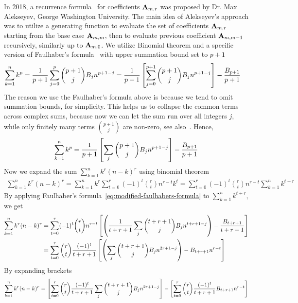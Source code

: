 In 2018, a recurrence formula~\cite{alekseyev2018mathoverflow} for coefficients ${\mathbf{A}} \sb{m,r}$
was proposed by Dr. Max Alekseyev, George Washington University.
The main idea of Alekseyev's approach was to utilize a generating function to evaluate
the set of coefficients ${\mathbf{A}} \sb{m,r}$
starting from the base case ${\mathbf{A}} \sb{m,m}$, then to evaluate previous coefficient ${\mathbf{A}} \sb{m,m-1}$
recursively, similarly up to ${\mathbf{A}} \sb{m,0}$.
We utilize Binomial theorem and a specific version
of Faulhaber's formula~\cite{beardon1996sums} with upper summation bound set to $p+1$
\begin{align*}
    \sum_{k=1}^{n} k^{p}
    = \frac{1}{p+1}\sum_{j=0}^{p} \binom{p+1}{j} {B}\sb{j} n^{p+1-j}
    &= \frac{1}{p+1} \left[ \sum_{j=0}^{p+1} \binom{p+1}{j} {B}\sb{j} n^{p+1-j} \right] - \frac{{B}\sb{p+1}}{p+1}
\end{align*}
The reason we use the Faulhaber's formula above is because we tend to omit summation bounds, for simplicity.
This helps us to collapse the common terms across complex sums, because now we can let the sum run over all integers $j$,
while only finitely many terms $\binom{p+1}{j}$ are non-zero, see also~\cite{knuth1992two}.
Hence,
\begin{align}
    \label{eq:modified-faulhabers-formula}
    \sum_{k=1}^{n} k^{p}
    = \frac{1}{p+1} \left[ \sum_{j} \binom{p+1}{j} {B}\sb{j} n^{p+1-j} \right] - \frac{{B}\sb{p+1}}{p+1}
\end{align}
Now we expand the sum $\sum_{k=1}^{n} k^{r} (n-k)^{r}$ using binomial theorem
\begin{align*}
    \sum_{k=1}^{n} k^{r} (n-k)^{r}
    = \sum_{k=1}^{n} k^{r} \sum_{t=0}^{r} (-1)^t \binom{r}{t} n^{r-t} k^{t}
    = \sum_{t=0}^{r} (-1)^t \binom{r}{t} n^{r-t} \sum_{k=1}^{n} k^{t+r}
\end{align*}
By applying Faulhaber's formula~\eqref{eq:modified-faulhabers-formula} to $\sum_{k=1}^{n} k^{t+r}$, we get
\begin{align*}
    \sum_{k=1}^{n} k^{r} (n-k)^{r}
    &= \sum_{t=0}^{r} (-1)^t \binom{r}{t} n^{r-t} \left[ \left( \frac{1}{t+r+1} \sum_{j} \binom{t+r+1}{j} {B}\sb{j} n^{t+r+1-j} \right) - \frac{{B}\sb{t+r+1}}{t+r+1} \right] \\
    &= \sum_{t=0}^{r} \binom{r}{t} \frac{(-1)^t}{t+r+1} \left[ \left( \sum_{j} \binom{t+r+1}{j} {B}\sb{j} n^{2r+1-j}  \right) - {B}\sb{t+r+1} n^{r-t} \right]
\end{align*}
By expanding brackets
\begin{align*}
    \sum_{k=1}^{n} k^{r} (n-k)^{r}
    = \left[ \sum_{t=0}^{r} \binom{r}{t} \frac{(-1)^t}{t+r+1} \sum_{j} \binom{t+r+1}{j} {B}\sb{j} n^{2r+1-j}  \right]
    - \left[ \sum_{t=0}^{r} \binom{r}{t} \frac{(-1)^t}{t+r+1} {B}\sb{t+r+1} n^{r-t} \right]
\end{align*}
